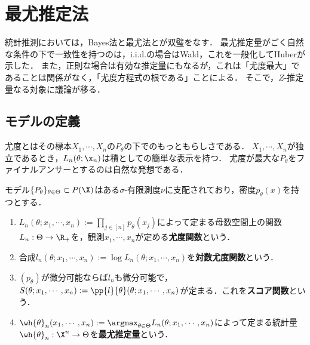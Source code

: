 \documentclass[uplatex,dvipdfmx]{jsreport}
\begin{document}
\section{最尤推定法}

\begin{tcolorbox}[colframe=ForestGreen, colback=ForestGreen!10!white,breakable,colbacktitle=ForestGreen!40!white,coltitle=black,fonttitle=\bfseries\sffamily,
    title=]
    統計推測においては，Bayes法と最尤法とが双璧をなす．
    最尤推定量がごく自然な条件の下で一致性を持つのは，i.i.d.の場合はWald，これを一般化してHuberが示した．
    また，正則な場合は有効な推定量にもなるが，これは「尤度最大」であることは関係がなく，「尤度方程式の根である」ことによる．
    そこで，$Z$-推定量なる対象に議論が移る．
\end{tcolorbox}

\subsection{モデルの定義}

\begin{tcolorbox}[colframe=ForestGreen, colback=ForestGreen!10!white,breakable,colbacktitle=ForestGreen!40!white,coltitle=black,fonttitle=\bfseries\sffamily,
title=]
    尤度とはその標本$X_1,\cdots,X_n$の$P_\theta$の下でのもっともらしさである．
    $X_1,\cdots,X_n$が独立であるとき，$L_n(\theta;\x_n)$は積としての簡単な表示を持つ．
    尤度が最大な$P_\theta$をファイナルアンサーとするのは自然な発想である．
\end{tcolorbox}

\begin{model}\label{model-for-MLE}
    モデル$\{P_\theta\}_{\theta\in\Theta}\subset P(\X)$はある$\sigma$-有限測度$\nu$に支配されており，密度$p_\theta(x)$を持つとする．
    \begin{enumerate}
        \item $L_n(\theta;x_1,\cdots,x_n):=\prod_{j\in[n]}p_\theta(x_j)$によって定まる母数空間上の関数$L_n:\Theta\to\R_+$を，観測$x_1,\cdots,x_n$が定める\textbf{尤度関数}という．
        \item 合成$l_n(\theta;x_1,\cdots,x_n):=\log L_n(\theta;x_1,\cdots,x_n)$を\textbf{対数尤度関数}という．
        \item $(p_\theta)$が微分可能ならば$l_n$も微分可能で，$S(\theta;x_1,\cdots,x_n):=\pp{l}{\theta}(\theta;x_1,\cdots,x_n)$が定まる．これを\textbf{スコア関数}という．
        \item $\wh{\theta}_n(x_1,\cdots,x_n):=\argmax_{\theta\in\Theta}L_n(\theta;x_1,\cdots,x_n)$によって定まる統計量$\wh{\theta}_n:\X^n\to\Theta$を\textbf{最尤推定量}という．
    \end{enumerate}
\end{model}
\end{document}
